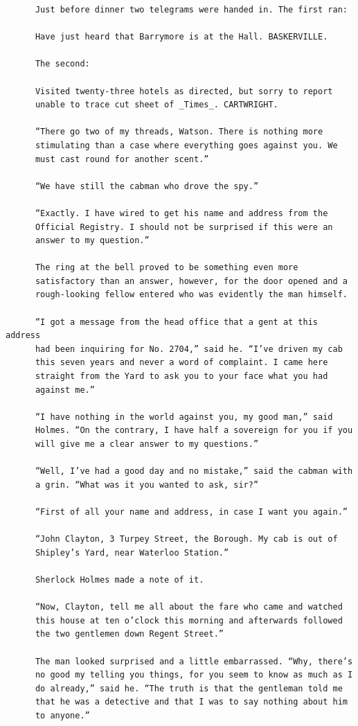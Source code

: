 \documentclass{article}
\begin{document}
\begin{verbatim}
      Just before dinner two telegrams were handed in. The first ran:

      Have just heard that Barrymore is at the Hall. BASKERVILLE.

      The second:

      Visited twenty-three hotels as directed, but sorry to report
      unable to trace cut sheet of _Times_. CARTWRIGHT.

      “There go two of my threads, Watson. There is nothing more
      stimulating than a case where everything goes against you. We
      must cast round for another scent.”

      “We have still the cabman who drove the spy.”

      “Exactly. I have wired to get his name and address from the
      Official Registry. I should not be surprised if this were an
      answer to my question.”

      The ring at the bell proved to be something even more
      satisfactory than an answer, however, for the door opened and a
      rough-looking fellow entered who was evidently the man himself.

      “I got a message from the head office that a gent at this address
      had been inquiring for No. 2704,” said he. “I’ve driven my cab
      this seven years and never a word of complaint. I came here
      straight from the Yard to ask you to your face what you had
      against me.”

      “I have nothing in the world against you, my good man,” said
      Holmes. “On the contrary, I have half a sovereign for you if you
      will give me a clear answer to my questions.”

      “Well, I’ve had a good day and no mistake,” said the cabman with
      a grin. “What was it you wanted to ask, sir?”

      “First of all your name and address, in case I want you again.”

      “John Clayton, 3 Turpey Street, the Borough. My cab is out of
      Shipley’s Yard, near Waterloo Station.”

      Sherlock Holmes made a note of it.

      “Now, Clayton, tell me all about the fare who came and watched
      this house at ten o’clock this morning and afterwards followed
      the two gentlemen down Regent Street.”

      The man looked surprised and a little embarrassed. “Why, there’s
      no good my telling you things, for you seem to know as much as I
      do already,” said he. “The truth is that the gentleman told me
      that he was a detective and that I was to say nothing about him
      to anyone.”


\end{verbatim}
\end{document}

